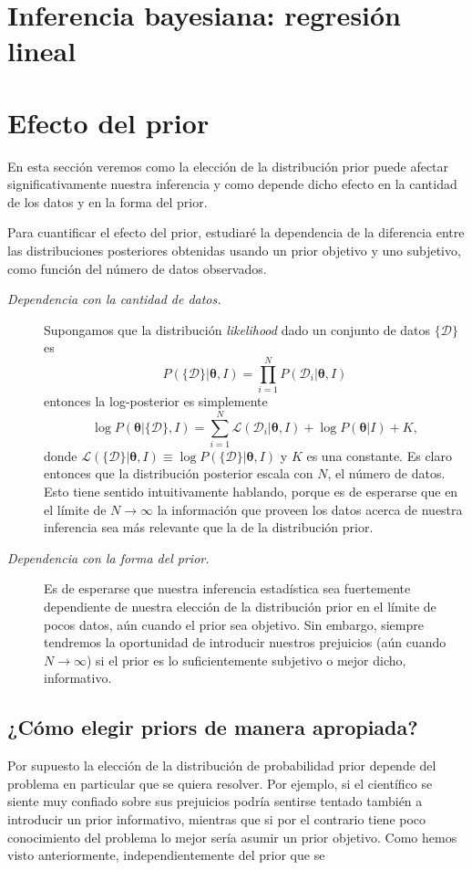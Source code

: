 \documentclass[a4paper,twoside]{article}
\newcommand{\hip}{\ensuremath{\bm{\theta}}\xspace}
\newcommand{\dat}{\ensuremath{\{\mathcal{D}\}}\xspace}
\begin{document}
\section{Inferencia bayesiana: regresión lineal}


\section{Efecto del prior}
%
En esta sección veremos como la elección de la distribución prior puede afectar significativamente
nuestra inferencia y como depende dicho efecto en la cantidad de los datos y en la forma del prior.

Para cuantificar el efecto del prior, estudiaré la dependencia de la diferencia entre las
distribuciones posteriores obtenidas usando un prior objetivo y uno subjetivo, como función del
número de datos observados.

\begin{description}
%
\item[\textit{\color{teal} Dependencia con la cantidad de datos.}] Supongamos que la distribución
\emph{likelihood} dado un conjunto de datos $\dat$ es
%
$$
P(\dat|\hip,I) = \prod_{i=1}^N P(\mathcal{D}_i|\hip,I)
$$
%
entonces la log-posterior es simplemente
%
$$
\log{P(\hip|\dat,I)} = \sum_{i=1}^N\mathcal{L}(\mathcal{D}_i|\hip,I) + \log{P(\hip|I)} + K,
$$
%
donde $\mathcal{L}(\dat|\hip,I)\equiv\log{P(\dat|\hip,I)}$ y $K$ es una constante. Es claro entonces
que la distribución posterior escala con $N$, el número de datos. Esto tiene sentido intuitivamente
hablando, porque es de esperarse que en el límite de $N\to\infty$ la información que proveen los
datos acerca de nuestra inferencia sea más relevante que la de la distribución prior.
%
\item[\textit{\color{teal} Dependencia con la forma del prior.}] Es de esperarse que nuestra
inferencia estadística sea fuertemente dependiente de nuestra elección de la distribución prior en
el límite de pocos datos, aún cuando el prior sea objetivo. Sin embargo, siempre tendremos la
oportunidad de introducir nuestros prejuicios (aún cuando $N\to\infty$) si el prior es lo
suficientemente subjetivo o mejor dicho, informativo.
%
\end{description}

\subsection*{¿Cómo elegir priors de manera apropiada?}
%
Por supuesto la elección de la distribución de probabilidad prior depende del problema en particular
que se quiera resolver. Por ejemplo, si el científico se siente muy confiado sobre sus prejuicios
podría sentirse tentado también a introducir un prior informativo, mientras que si por el contrario
tiene poco conocimiento del problema lo mejor sería asumir un prior objetivo. Como hemos visto
anteriormente, independientemente del prior que se
\end{document}
